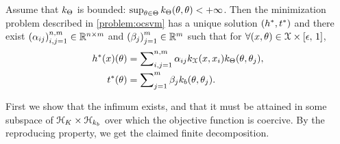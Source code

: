 %
%
\begin{proposition}[Representer] \label{theorem:representer_ocsvm}
    Assume that $k_{\Theta}$ is bounded: $\sup_{\theta
    \in \Theta} k_{\Theta}(\theta,\theta) < +\infty$.
    Then the  minimization problem described in \cref{problem:ocsvm} has a
    unique solution $(h^{*}, t^{*})$ and  there exist
    $\left(\alpha_{ij}\right)_{i,j = 1}^{n,m}\in \mathbb{R}^{n\times m}$ and $\left
    ( \beta_{j} \right)_{j=1}^m \in \mathbb{R}^m$ such that for $\forall
    (x,\theta) \in \mathcal{X} \times \left[\epsilon,\,1\right]$,
     \begin{align*}
            h^{*}(x)(\theta) &=
            \sum\nolimits_{i,j=1}^{n,m}
            \alpha_{ij} k_{\mathcal{X}}(x,x_i)
            k_{\Theta}(\theta,\theta_j),\\
            t^*(\theta) &= \sum\nolimits_{j=1}^{m} \beta_{j}
            k_{b}(\theta,\theta_j).
     \end{align*}
\end{proposition}
\begin{sproof}
    First we show that the infimum exists, and that it must be attained in some
    subspace of $\mathcal{H}_K \times \mathcal{H}_{k_b}$ over which the objective function is
    coercive. By the reproducing property, we get the claimed finite decomposition.
\end{sproof}
